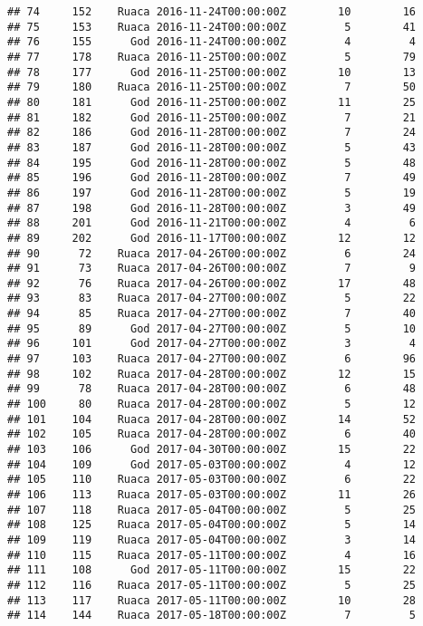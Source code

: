 \documentclass[
]{article}
\begin{document}
\begin{verbatim}
## 74     152    Ruaca 2016-11-24T00:00:00Z        10        16
## 75     153    Ruaca 2016-11-24T00:00:00Z         5        41
## 76     155      God 2016-11-24T00:00:00Z         4         4
## 77     178    Ruaca 2016-11-25T00:00:00Z         5        79
## 78     177      God 2016-11-25T00:00:00Z        10        13
## 79     180    Ruaca 2016-11-25T00:00:00Z         7        50
## 80     181      God 2016-11-25T00:00:00Z        11        25
## 81     182      God 2016-11-25T00:00:00Z         7        21
## 82     186      God 2016-11-28T00:00:00Z         7        24
## 83     187      God 2016-11-28T00:00:00Z         5        43
## 84     195      God 2016-11-28T00:00:00Z         5        48
## 85     196      God 2016-11-28T00:00:00Z         7        49
## 86     197      God 2016-11-28T00:00:00Z         5        19
## 87     198      God 2016-11-28T00:00:00Z         3        49
## 88     201      God 2016-11-21T00:00:00Z         4         6
## 89     202      God 2016-11-17T00:00:00Z        12        12
## 90      72    Ruaca 2017-04-26T00:00:00Z         6        24
## 91      73    Ruaca 2017-04-26T00:00:00Z         7         9
## 92      76    Ruaca 2017-04-26T00:00:00Z        17        48
## 93      83    Ruaca 2017-04-27T00:00:00Z         5        22
## 94      85    Ruaca 2017-04-27T00:00:00Z         7        40
## 95      89      God 2017-04-27T00:00:00Z         5        10
## 96     101      God 2017-04-27T00:00:00Z         3         4
## 97     103    Ruaca 2017-04-27T00:00:00Z         6        96
## 98     102    Ruaca 2017-04-28T00:00:00Z        12        15
## 99      78    Ruaca 2017-04-28T00:00:00Z         6        48
## 100     80    Ruaca 2017-04-28T00:00:00Z         5        12
## 101    104    Ruaca 2017-04-28T00:00:00Z        14        52
## 102    105    Ruaca 2017-04-28T00:00:00Z         6        40
## 103    106      God 2017-04-30T00:00:00Z        15        22
## 104    109      God 2017-05-03T00:00:00Z         4        12
## 105    110    Ruaca 2017-05-03T00:00:00Z         6        22
## 106    113    Ruaca 2017-05-03T00:00:00Z        11        26
## 107    118    Ruaca 2017-05-04T00:00:00Z         5        25
## 108    125    Ruaca 2017-05-04T00:00:00Z         5        14
## 109    119    Ruaca 2017-05-04T00:00:00Z         3        14
## 110    115    Ruaca 2017-05-11T00:00:00Z         4        16
## 111    108      God 2017-05-11T00:00:00Z        15        22
## 112    116    Ruaca 2017-05-11T00:00:00Z         5        25
## 113    117    Ruaca 2017-05-11T00:00:00Z        10        28
## 114    144    Ruaca 2017-05-18T00:00:00Z         7         5

\end{verbatim}
\end{document}
